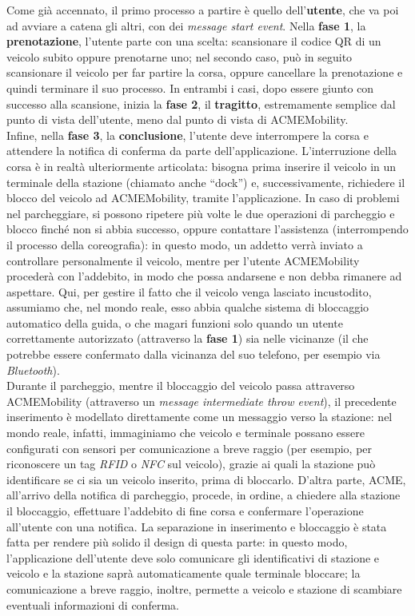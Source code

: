 Come già accennato, il primo processo a partire è quello dell'\textbf{utente},
che va poi ad avviare a catena gli altri, con dei \textit{message start event}.
Nella \textbf{fase 1}, la \textbf{prenotazione}, l'utente parte con una scelta:
scansionare il codice QR di un veicolo subito oppure prenotarne uno; nel secondo
caso, può in seguito scansionare il veicolo per far partire la corsa, oppure
cancellare la prenotazione e quindi terminare il suo processo. In entrambi i
casi, dopo essere giunto con successo alla scansione, inizia la \textbf{fase 2},
il \textbf{tragitto}, estremamente semplice dal punto di vista dell'utente, meno
dal punto di vista di ACMEMobility.\\
Infine, nella \textbf{fase 3}, la \textbf{conclusione}, l'utente deve
interrompere la corsa e attendere la notifica di conferma da parte
dell'applicazione. L'interruzione della corsa è in realtà ulteriormente
articolata: bisogna prima inserire il veicolo in un terminale della stazione
(chiamato anche ``dock'') e, successivamente, richiedere il blocco del veicolo
ad ACMEMobility, tramite l'applicazione. In caso di problemi nel parcheggiare,
si possono ripetere più volte le due operazioni di parcheggio e blocco finché
non si abbia successo, oppure contattare l'assistenza (interrompendo il processo
della coreografia): in questo modo, un addetto verrà inviato a controllare
personalmente il veicolo, mentre per l'utente ACMEMobility procederà con
l'addebito, in modo che possa andarsene e non debba rimanere ad aspettare. Qui,
per gestire il fatto che il veicolo venga lasciato incustodito, assumiamo che,
nel mondo reale, esso abbia qualche sistema di bloccaggio automatico della
guida, o che magari funzioni solo quando un utente correttamente autorizzato
(attraverso la \textbf{fase 1}) sia nelle vicinanze (il che potrebbe essere
confermato dalla vicinanza del suo telefono, per esempio via
\textit{Bluetooth}).\\
Durante il parcheggio, mentre il bloccaggio del veicolo passa attraverso ACMEMobility
(attraverso un \textit{message intermediate throw event}), il precedente
inserimento è modellato direttamente come un messaggio verso la stazione: nel
mondo reale, infatti, immaginiamo che veicolo e terminale possano essere
configurati con sensori per comunicazione a breve raggio (per esempio, per
riconoscere un tag \textit{RFID} o \textit{NFC} sul veicolo), grazie ai quali la
stazione può identificare se ci sia un veicolo inserito, prima di bloccarlo.
D'altra parte, ACME, all'arrivo della notifica di parcheggio, procede, in
ordine, a chiedere alla stazione il bloccaggio, effettuare l'addebito di fine
corsa e confermare l'operazione all'utente con una notifica. La separazione in
inserimento e bloccaggio è stata fatta per rendere più solido il design di
questa parte: in questo modo, l'applicazione dell'utente deve solo comunicare
gli identificativi di stazione e veicolo e la stazione saprà automaticamente
quale terminale bloccare; la comunicazione a breve raggio, inoltre, permette a
veicolo e stazione di scambiare eventuali informazioni di conferma.\\



